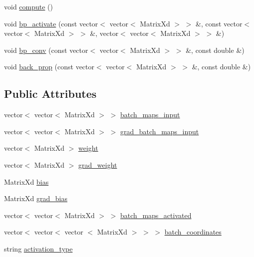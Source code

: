 \begin{DoxyCompactItemize}
\item 
void \hyperlink{classlibcnn_1_1_conv_pool_layer_a29c5445a08cf88d44a69b9370e5adc1d}{compute} ()
\item 
void \hyperlink{classlibcnn_1_1_conv_pool_layer_a32bafdf90d99eb5fc5902f831b208838}{bp\-\_\-activate} (const vector$<$ vector$<$ \-Matrix\-Xd $>$ $>$ \&, const vector$<$ vector$<$ \-Matrix\-Xd $>$ $>$ \&, vector$<$ vector$<$ \-Matrix\-Xd $>$ $>$ \&)
\item 
void \hyperlink{classlibcnn_1_1_conv_pool_layer_a30204d1f55cc343c422cb6da5b1b4590}{bp\-\_\-conv} (const vector$<$ vector$<$ \-Matrix\-Xd $>$ $>$ \&, const double \&)
\item 
void \hyperlink{classlibcnn_1_1_conv_pool_layer_ab74a2227a84ff1de545dd1e69f0c8fb3}{back\-\_\-prop} (const vector$<$ vector$<$ \-Matrix\-Xd $>$ $>$ \&, const double \&)
\end{DoxyCompactItemize}
\subsection*{\-Public \-Attributes}
\begin{DoxyCompactItemize}
\item 
vector$<$ vector$<$ \-Matrix\-Xd $>$ $>$ \hyperlink{classlibcnn_1_1_conv_pool_layer_a63d9d97664284772029c36a897e4e30e}{batch\-\_\-maps\-\_\-input}
\item 
vector$<$ vector$<$ \-Matrix\-Xd $>$ $>$ \hyperlink{classlibcnn_1_1_conv_pool_layer_a519dad823100b62bc93738477a593a6d}{grad\-\_\-batch\-\_\-maps\-\_\-input}
\item 
vector$<$ \-Matrix\-Xd $>$ \hyperlink{classlibcnn_1_1_conv_pool_layer_ad9b3b0b372858e32e075565beec5226a}{weight}
\item 
vector$<$ \-Matrix\-Xd $>$ \hyperlink{classlibcnn_1_1_conv_pool_layer_a2728855bb4a00c4800ff4a912ef21e85}{grad\-\_\-weight}
\item 
\-Matrix\-Xd \hyperlink{classlibcnn_1_1_conv_pool_layer_a8b537b16fb08d935f442360f564b9403}{bias}
\item 
\-Matrix\-Xd \hyperlink{classlibcnn_1_1_conv_pool_layer_a4bf6b594b2a91f6bd8291ff8e446e4ba}{grad\-\_\-bias}
\item 
vector$<$ vector$<$ \-Matrix\-Xd $>$ $>$ \hyperlink{classlibcnn_1_1_conv_pool_layer_ad42c5b645c6103b200b9b950b4349550}{batch\-\_\-maps\-\_\-activated}
\item 
vector$<$ vector$<$ vector\*
$<$ \-Matrix\-Xd $>$ $>$ $>$ \hyperlink{classlibcnn_1_1_conv_pool_layer_a0b8d18fc0be5f3e75813a86b24dce247}{batch\-\_\-coordinates}
\item 
string \hyperlink{classlibcnn_1_1_conv_pool_layer_aa57ba56fe0f3e38f58931137a03e07f3}{activation\-\_\-type}
\end{DoxyCompactItemize}



